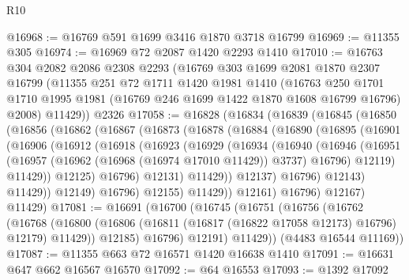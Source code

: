 \begin{lexlean}{R10}
\begin{coremodule}
@16968 := @16769 @591 @1699 @3416 @1870 @3718 @16799
@16969 := @11355 @305
@16974 := @16969 @72 @2087 @1420 @2293 @1410
@17010 := @16763
    @304
    @2082
    @2086
    @2308
    @2293
    (@16769
      @303
      @1699
      @2081
      @1870
      @2307
      @16799
      (@11355
        @251
        @72
        @1711
        @1420
        @1981
        @1410
        (@16763
          @250
          @1701
          @1710
          @1995
          @1981
          (@16769 @246 @1699 @1422 @1870 @1608 @16799 @16796)
          @2008)
        @11429))
    @2326
@17058 := @16828
    (@16834
      (@16839
        (@16845
          (@16850
            (@16856
              (@16862
                (@16867
                  (@16873
                    (@16878
                      (@16884
                        (@16890
                          (@16895
                            (@16901
                              (@16906
                                (@16912
                                  (@16918
                                    (@16923
                                      (@16929
                                        (@16934
                                          (@16940
                                            (@16946
                                              (@16951
                                                (@16957
                                                  (@16962 (@16968 (@16974 @17010 @11429)) @3737)
                                                  @16796)
                                                @12119)
                                              @11429))
                                          @12125)
                                        @16796)
                                      @12131)
                                    @11429))
                                @12137)
                              @16796)
                            @12143)
                          @11429))
                      @12149)
                    @16796)
                  @12155)
                @11429))
            @12161)
          @16796)
        @12167)
      @11429)
@17081 := @16691
    (@16700
      (@16745
        (@16751
          (@16756
            (@16762
              (@16768
                (@16800 (@16806 (@16811 (@16817 (@16822 @17058 @12173) @16796) @12179) @11429))
                @12185)
              @16796)
            @12191)
          @11429))
      (@4483 @16544 @11169))
@17087 := @11355 @663 @72 @16571 @1420 @16638 @1410
@17091 := @16631 @647 @662 @16567 @16570
@17092 := @64 @16553
@17093 := @1392 @17092

\end{coremodule}
\end{lexlean}
